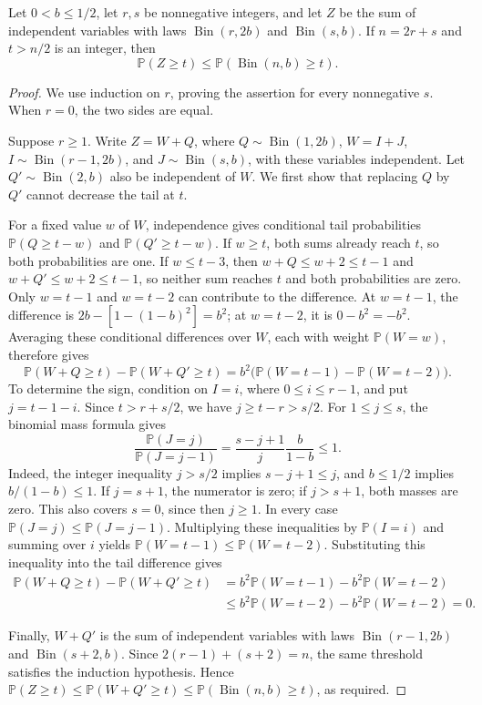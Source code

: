 \documentclass[10pt,a4paper]{article}
\DeclareMathOperator{\Bin}{Bin}
\newcommand{\Pp}{\mathbb P}
\begin{document}
\begin{lemma}\label{lem:pairtail}
Let \(0<b\le1/2\), let \(r,s\) be nonnegative integers, and let \(Z\) be the sum of independent variables with laws \(\Bin(r,2b)\) and \(\Bin(s,b)\). If \(n=2r+s\) and \(t>n/2\) is an integer, then
\begin{equation}\label{eq:pairtail}
\Pp(Z\ge t)\le\Pp(\Bin(n,b)\ge t).
\end{equation}
\end{lemma}
\begin{proof}
We use induction on \(r\), proving the assertion for every nonnegative \(s\). When \(r=0\), the two sides are equal.

Suppose \(r\ge1\). Write \(Z=W+Q\), where \(Q\sim\Bin(1,2b)\), \(W=I+J\), \(I\sim\Bin(r-1,2b)\), and \(J\sim\Bin(s,b)\), with these variables independent. Let \(Q'\sim\Bin(2,b)\) also be independent of \(W\). We first show that replacing \(Q\) by \(Q'\) cannot decrease the tail at \(t\).

For a fixed value \(w\) of \(W\), independence gives conditional tail probabilities \(\Pp(Q\ge t-w)\) and \(\Pp(Q'\ge t-w)\). If \(w\ge t\), both sums already reach \(t\), so both probabilities are one. If \(w\le t-3\), then \(w+Q\le w+2\le t-1\) and \(w+Q'\le w+2\le t-1\), so neither sum reaches \(t\) and both probabilities are zero. Only \(w=t-1\) and \(w=t-2\) can contribute to the difference. At \(w=t-1\), the difference is \(2b-[1-(1-b)^2]=b^2\); at \(w=t-2\), it is \(0-b^2=-b^2\). Averaging these conditional differences over \(W\), each with weight \(\Pp(W=w)\), therefore gives
\[
\Pp(W+Q\ge t)-\Pp(W+Q'\ge t)
=b^2\bigl(\Pp(W=t-1)-\Pp(W=t-2)\bigr).
\]
To determine the sign, condition on \(I=i\), where \(0\le i\le r-1\), and put \(j=t-1-i\). Since \(t>r+s/2\), we have \(j\ge t-r>s/2\). For \(1\le j\le s\), the binomial mass formula gives
\[
\frac{\Pp(J=j)}{\Pp(J=j-1)}
=\frac{s-j+1}{j}\frac{b}{1-b}\le1.
\]
Indeed, the integer inequality \(j>s/2\) implies \(s-j+1\le j\), and \(b\le1/2\) implies \(b/(1-b)\le1\). If \(j=s+1\), the numerator is zero; if \(j>s+1\), both masses are zero. This also covers \(s=0\), since then \(j\ge1\). In every case \(\Pp(J=j)\le\Pp(J=j-1)\). Multiplying these inequalities by \(\Pp(I=i)\) and summing over \(i\) yields \(\Pp(W=t-1)\le\Pp(W=t-2)\). Substituting this inequality into the tail difference gives
\[
\begin{aligned}
\Pp(W+Q\ge t)-\Pp(W+Q'\ge t)
&=b^2\Pp(W=t-1)-b^2\Pp(W=t-2)\\
&\le b^2\Pp(W=t-2)-b^2\Pp(W=t-2)=0.
\end{aligned}
\]

Finally, \(W+Q'\) is the sum of independent variables with laws \(\Bin(r-1,2b)\) and \(\Bin(s+2,b)\). Since \(2(r-1)+(s+2)=n\), the same threshold satisfies the induction hypothesis. Hence \(\Pp(Z\ge t)\le\Pp(W+Q'\ge t)\le\Pp(\Bin(n,b)\ge t)\), as required.
\end{proof}
\end{document}
